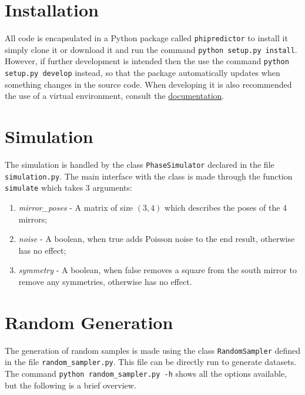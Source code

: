 \documentclass[conference]{IEEEtran}
\begin{document}
\maketitle

\section{Installation}

All code is encapsulated in a Python package called \verb|phipredictor| to 
install it simply clone it or download it and run the command \verb|python setup.py install|.
However, if further development is intended then the use the command
\verb|python setup.py develop| instead, so that the package automatically
updates when something changes in the source code. When developing it is also
recommended the use of a virtual environment, consult the
\href{https://docs.python.org/3/library/venv.html}{documentation}.

\section{Simulation}

The simulation is handled by the class \verb|PhaseSimulator| declared in the file
\verb|simulation.py|. The main interface with the class is made through the 
function \verb|simulate| which takes 3 arguments:

\begin{enumerate}
    \item \textit{mirror\_poses} - A matrix of size $(3,4)$ which describes
    the poses of the 4 mirrors;
    \item \textit{noise} - A boolean, when true adds Poisson noise to the
    end result, otherwise has no effect;
    \item \textit{symmetry} - A boolean, when false removes a square from the
    south mirror to remove any symmetries, otherwise has no effect.
\end{enumerate}

\section{Random Generation}

The generation of random samples is made using the class \verb|RandomSampler|
defined in the file \verb|random_sampler.py|. This file can be directly run 
to generate datasets. The command \verb|python random_sampler.py -h| shows 
all the options available, but the following is a brief overview.
\end{document}
